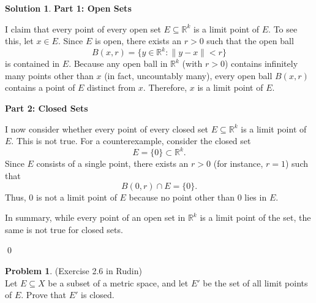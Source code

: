 \documentclass[12pt,oneside]{article}
\theoremstyle{definition}
\newtheorem{problem}{Problem}
\newtheorem{solution}{Solution}
\begin{document}
\begin{solution}
\textbf{Part 1: Open Sets}

I claim that every point of every open set \( E \subseteq \mathbb{R}^k \) is a limit point of \( E \). To see this, let \( x \in E \). Since \( E \) is open, there exists an \( r > 0 \) such that the open ball
\[
B(x,r) = \{ y \in \mathbb{R}^k : \|y - x\| < r \}
\]
is contained in \( E \). Because any open ball in \( \mathbb{R}^k \) (with \( r > 0 \)) contains infinitely many points other than \( x \) (in fact, uncountably many), every open ball \( B(x,r) \) contains a point of \( E \) distinct from \( x \). Therefore, \( x \) is a limit point of \( E \).

\bigskip
\textbf{Part 2: Closed Sets}

I now consider whether every point of every closed set \( E \subseteq \mathbb{R}^k \) is a limit point of \( E \). This is not true. For a counterexample, consider the closed set
\[
E = \{0\} \subset \mathbb{R}^k.
\]
Since \( E \) consists of a single point, there exists an \( r > 0 \) (for instance, \( r = 1 \)) such that
\[
B(0, r) \cap E = \{0\}.
\]
Thus, \( 0 \) is not a limit point of \( E \) because no point other than \( 0 \) lies in \( E \). 

In summary, while every point of an open set in \( \mathbb{R}^k \) is a limit point of the set, the same is not true for closed sets.

\qed
\end{solution}

\newpage
\begin{problem}
(Exercise 2.6 in Rudin)\\[1mm]
Let \( E \subseteq X \) be a subset of a metric space, and let \( E' \) be the set of all limit points of \( E \). Prove that \( E' \) is closed.
\end{problem}
\newpage
\end{document}
